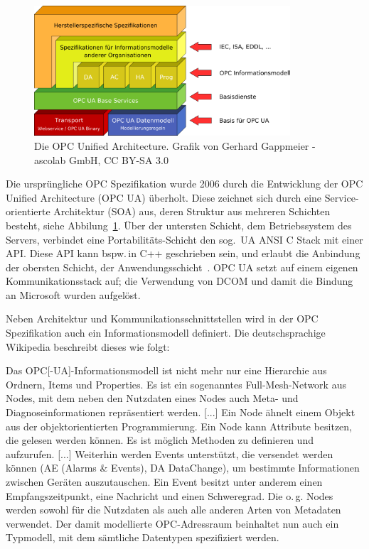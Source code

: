 \begin{figure}
    \centering
    \includegraphics[width=0.85\textwidth]{images/UA_Architecture_1024.png}
    \caption{Die OPC Unified Architecture. Grafik von Gerhard Gappmeier - ascolab GmbH, CC BY-SA 3.0}
    \label{fig:opc-unified-architecture}
\end{figure}

Die ursprüngliche OPC Spezifikation wurde 2006 durch die Entwicklung der 
OPC Unified Architecture (OPC UA) überholt. 
Diese zeichnet sich durch eine Service-orientierte Architektur (SOA) aus, deren Struktur
aus mehreren Schichten besteht, siehe Abbilung~\ref{fig:opc-unified-architecture}. 
Über der untersten Schicht, dem Betriebssystem des Servers, verbindet eine Portabilitäts-Schicht 
den sog.\, UA ANSI C Stack mit einer API. Diese API kann bspw.\,in C++ geschrieben sein, 
und erlaubt die Anbindung der obersten Schicht, der Anwendungsschicht~\citep[vgl.][]{web-spec-opc}.
OPC UA setzt auf einem eigenen Kommunikationsstack auf; die Verwendung von DCOM
und damit die Bindung an Microsoft wurden aufgelöst.

Neben Architektur und Kommunikationsschnittstellen wird in der OPC Spezifikation auch ein 
Informationsmodell definiert. Die deutschsprachige Wikipedia beschreibt dieses wie folgt: 

\glqq{}Das OPC[-UA]-Informationsmodell ist nicht mehr nur eine Hierarchie aus Ordnern, Items
und Properties. Es ist ein sogenanntes Full-Mesh-Network aus Nodes, mit dem neben
den Nutzdaten eines Nodes auch Meta- und Diagnoseinformationen repräsentiert werden. [...]
Ein Node ähnelt einem Objekt aus der objektorientierten Programmierung. Ein Node
kann Attribute besitzen, die gelesen werden können. Es ist möglich Methoden zu definieren und aufzurufen. [...]
Weiterhin werden Events unterstützt, die versendet werden können
(AE (Alarms \& Events), DA DataChange), um bestimmte Informationen zwischen Geräten
auszutauschen. Ein Event besitzt unter anderem einen Empfangszeitpunkt, eine Nachricht
und einen Schweregrad. Die o.\,g. Nodes werden sowohl für die Nutzdaten als auch
alle anderen Arten von Metadaten verwendet. Der damit modellierte OPC-Adressraum
beinhaltet nun auch ein Typmodell, mit dem sämtliche Datentypen spezifiziert werden.\grqq{}


